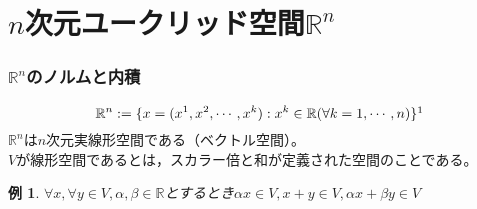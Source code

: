 \documentclass[dvipdfmx,a4j,10pt]{jsarticle}
\theoremstyle{mystyle1}
\theoremstyle{mystyle2}
\newtheorem{example}{例}
\begin{document}
\newpage

\part{$n$次元ユークリッド空間$\mathbb{R}^n$}

\section{$\mathbb{R}^n$のノルムと内積}
\[\mathbb{R}^n:=\{x=(x^1,x^2,\cdots,x^k):x^k\in\mathbb{R}(\forall k=1,\cdots,n)\}\footnotemark\]
$\mathbb{R}^n$は$n$次元実線形空間である（ベクトル空間）。\\
$V$が線形空間であるとは，スカラー倍と和が定義された空間のことである。
\begin{example}
$\forall x,\forall y\in V,\alpha,\beta\in\mathbb{R}$とするとき$\alpha x\in V,x+y\in V,\alpha x+\beta y\in V$
\end{example}
\end{document}
